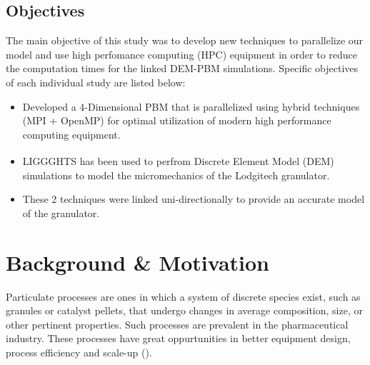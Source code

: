 \documentclass[preprint,11pt,authoryear]{elsarticle}
\begin{document}
	    \subsection{Objectives}
	    \par The main objective of this study was to develop new techniques to parallelize our model and use high perfomance computing (HPC) equipment in order to reduce the computation times for the linked DEM-PBM simulations. Specific objectives of each individual study are listed below: 
	    \begin{itemize}
	    \item Developed a 4-Dimensional PBM that is parallelized using hybrid techniques (MPI + OpenMP)  for optimal utilization of modern high performance computing equipment.
	    \item LIGGGHTS\textsuperscript{\textregistered} has been used to perfrom Discrete Element Model (DEM) simulations to  model the micromechanics of the Lodgitech granulator. 
		\item These 2 techniques were linked uni-directionally to provide an accurate model of the granulator.	    
	    \end{itemize}

	

	\section{Background \& Motivation}
	
	  \par Particulate processes are ones in which a system of discrete species exist, such as granules or catalyst pellets, that undergo changes in average composition, size, or other pertinent properties. Such processes are prevalent in the pharmaceutical industry. These processes have great oppurtunities in better equipment design, process efficiency and scale-up (\cite{Ketterhagen2009}). 
	     
	  
\end{document}
